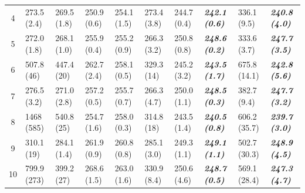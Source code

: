 \begin{table}[!h]
\begin{adjustbox}{max width=1\textwidth}{}
\begin{tabular}{@{}c|lllllll|ll@{}}
4  & 273.5 (2.4)& 269.5 (1.8) & 250.9 (0.6) & 254.1 (1.5) & 273.4 (3.8) & 244.7 (0.4) & \textbf{\textit{242.1 (0.6)}} & 336.1 (9.5) & \textit{\textbf{240.8 (4.0)}}  \\
5  & 272.0 (1.8)& 268.1 (1.0) & 255.9 (0.4) & 255.2 (0.9) & 266.3 (3.2) & 250.8 (0.8) & \textbf{\textit{248.6 (0.2)}} & 333.6 (3.7) & \textit{\textbf{247.7 (3.5)}}  \\
6  & 507.8 (46) & 447.4 (20)  & 262.7 (2.4) & 258.1 (0.5) & 329.3 (14)  & 245.2 (3.2) & \textbf{\textit{243.5 (1.7)}} & 675.8 (14.1)& \textit{\textbf{242.8 (5.6)}}  \\
7  & 276.5 (3.2)& 271.0 (2.8) & 257.2 (0.5) & 255.7 (0.7) & 266.3 (4.7) & 250.0 (1.1) & \textbf{\textit{248.5 (0.3)}} & 382.7 (9.4) & \textit{\textbf{247.7 (3.2)}}  \\
8  & 1468 (585) & 540.8 (25)  & 254.7 (1.6) & 258.0 (0.3) & 314.8 (18)  & 243.5 (1.4) & \textbf{\textit{240.5 (0.8)}} & 606.2 (35.7)& \textit{\textbf{239.7 (3.0)}}  \\
9  & 310.1 (19) & 284.1 (1.4) & 261.9 (0.9) & 260.8 (0.8) & 285.1 (3.0) & 249.3 (1.1) & \textbf{\textit{249.1 (1.1)}} & 502.7 (30.3)& \textit{\textbf{248.9 (4.5)}}  \\
10 & 799.9 (273)& 399.2 (27)  & 268.6 (1.5) & 263.0 (1.6) & 330.9 (8.4) & 250.6 (4.6) & \textbf{\textit{248.7 (0.5)}} & 569.1 (28.4)& \textit{\textbf{247.3 (4.7)}}   \\
\bottomrule
\end{tabular}
\end{adjustbox}
\vspace*{\baselineskip}
\end{table}

